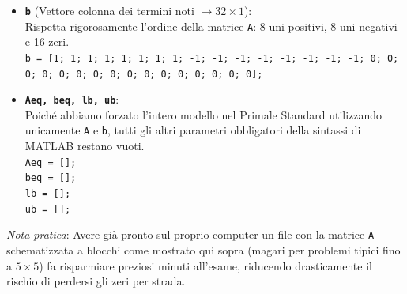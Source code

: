 \documentclass[12pt, a4paper]{article}
\begin{document}
\begin{itemize}
		\texttt{0  0  0  0  0 -1  0  0  0  0  0  0  0  0  0  0;}\\
		\texttt{0  0  0  0  0  0 -1  0  0  0  0  0  0  0  0  0;}\\
		\texttt{0  0  0  0  0  0  0 -1  0  0  0  0  0  0  0  0;}\\
		\texttt{0  0  0  0  0  0  0  0 -1  0  0  0  0  0  0  0;}\\
		\texttt{0  0  0  0  0  0  0  0  0 -1  0  0  0  0  0  0;}\\
		\texttt{0  0  0  0  0  0  0  0  0  0 -1  0  0  0  0  0;}\\
		\texttt{0  0  0  0  0  0  0  0  0  0  0 -1  0  0  0  0;}\\
		\texttt{0  0  0  0  0  0  0  0  0  0  0  0 -1  0  0  0;}\\
		\texttt{0  0  0  0  0  0  0  0  0  0  0  0  0 -1  0  0;}\\
		\texttt{0  0  0  0  0  0  0  0  0  0  0  0  0  0 -1  0;}\\
		\texttt{0  0  0  0  0  0  0  0  0  0  0  0  0  0  0 -1}\\
		\texttt{];}
		
		\item \textbf{\texttt{b}} (Vettore colonna dei termini noti $\rightarrow 32 \times 1$):\\
		Rispetta rigorosamente l'ordine della matrice \texttt{A}: 8 uni positivi, 8 uni negativi e 16 zeri.\\
		\texttt{b = [1; 1; 1; 1; 1; 1; 1; 1; -1; -1; -1; -1; -1; -1; -1; -1; 0; 0; 0; 0; 0; 0; 0; 0; 0; 0; 0; 0; 0; 0; 0; 0];}
		
		\item \textbf{\texttt{Aeq, beq, lb, ub}}:\\
		Poiché abbiamo forzato l'intero modello nel Primale Standard utilizzando unicamente \texttt{A} e \texttt{b}, tutti gli altri parametri obbligatori della sintassi di MATLAB restano vuoti.\\
		\texttt{Aeq = [];}\\
		\texttt{beq = [];}\\
		\texttt{lb = [];}\\
		\texttt{ub = [];}
	\end{itemize}
	
	\textit{Nota pratica}: Avere già pronto sul proprio computer un file con la matrice \texttt{A} schematizzata a blocchi come mostrato qui sopra (magari per problemi tipici fino a $5 \times 5$) fa risparmiare preziosi minuti all'esame, riducendo drasticamente il rischio di perdersi gli zeri per strada.\\
	
\end{document}
